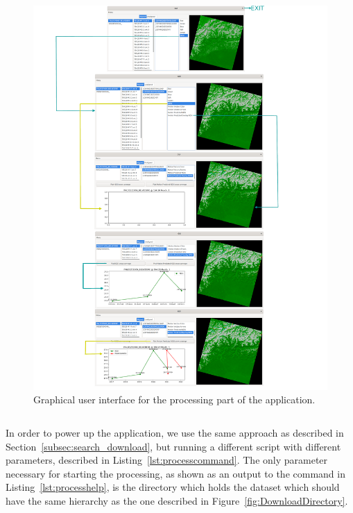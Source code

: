 \documentclass[12pt, a4paper]{report}
\begin{document}
	\begin{figure}[h]
		\centering
		\includegraphics[width=\columnwidth]{../images/GUI.png}
		\caption{Graphical user interface for the processing part of the application.}
		\label{fig:gui}
	\end{figure}

	\begin{lstlisting}[caption={Help command for processing.},label={lst:processcommand},language=Bash]
	% bash -x run_process.sh --help
	\end{lstlisting}

	In order to power up the application, we use the same approach as described in Section~\ref{subsec:search_download}, but running a different script with different parameters, described in Listing~\ref{lst:processcommand}. The only parameter necessary for starting the processing, as shown as an output to the command in Listing~\ref{lst:processhelp}, is the directory which holds the dataset which should have the same hierarchy as the one described in Figure~\ref{fig:DownloadDirectory}.
\end{document}
